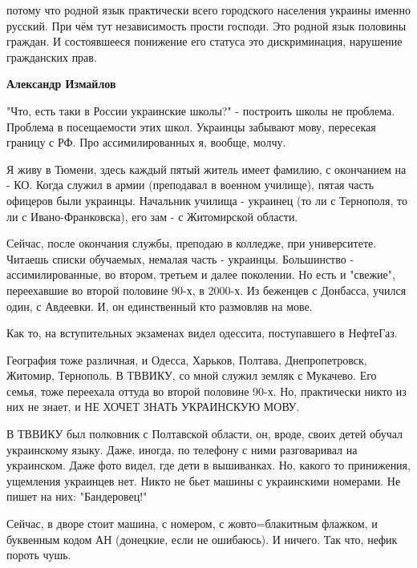 \begin{itemize}
\begin{itemize}
потому что родной язык практически всего городского населения украины именно
русский. При чём тут независимость прости господи. Это родной язык половины
граждан. И состоявшееся понижение его статуса это дискриминация, нарушение
гражданских прав.

 

\textbf{Александр Измайлов} 

"Что, есть таки в России украинские школы?" - построить школы не проблема.
Проблема в посещаемости этих школ. Украинцы забывают мову, пересекая границу с
РФ. Про ассимилированных я, вообще, молчу. 

Я живу в Тюмени, здесь каждый пятый житель имеет фамилию, с окончанием на - КО.
Когда служил в армии (преподавал в военном училище), пятая часть офицеров были
украинцы.  Начальник училища - украинец (то ли с Тернополя, то ли с
Ивано-Франковска), его зам - с Житомирской области. 

Сейчас, после окончания службы, преподаю в колледже, при университете. Читаешь
списки обучаемых, немалая часть - украинцы.  Большинство - ассимилированные, во
втором, третьем и далее поколении. Но есть и "свежие", переехавшие во второй
половине 90-х, в 2000-х. Из беженцев с Донбасса, учился один, с Авдеевки. И, он
единственный кто размовляв на мове.


Как то, на вступительных экзаменах видел одессита, поступавшего в НефтеГаз.

География тоже различная, и Одесса, Харьков, Полтава, Днепропетровск, Житомир,
Тернополь. В ТВВИКУ, со мной служил земляк с Мукачево. Его семья, тоже
переехала оттуда во второй половине 90-х. Но, практически никто из них не
знает, и НЕ ХОЧЕТ ЗНАТЬ УКРАИНСКУЮ МОВУ. 

В ТВВИКУ был полковник с Полтавской области, он, вроде, своих детей обучал
украинскому языку. Даже, иногда, по телефону с ними разговаривал на украинском.
Даже фото видел, где дети в вышиванках. Но, какого то принижения, ущемления
украинцев нет. Никто не бьет машины с украинскими номерами. Не пишет на них:
"Бандеровец!" 

Сейчас, в дворе стоит машина, с номером, с жовто=блакитным флажком, и буквенным
кодом АН (донецкие, если не ошибаюсь). И ничего. Так что, нефик пороть чушь.

 

\end{itemize}
\end{itemize}
